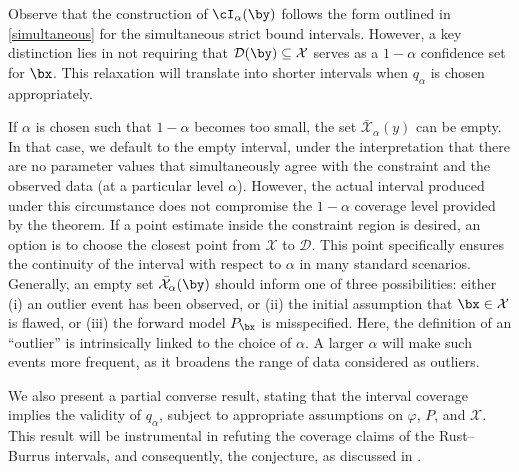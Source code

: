 \documentclass[11pt]{article}
\numberwithin{equation}{section}
\numberwithin{figure}{section}
\begin{document}
\begin{remark}
    Observe that the construction of $\cI_\alpha(\by)$ follows the form outlined in \eqref{simultaneous} for the simultaneous strict bound intervals. 
    However, a key distinction lies in not requiring that $\mathcal{D}(\by) \subseteq \mathcal X$ serves as a $1-\alpha$ confidence set for $\bx$.
    This relaxation will translate into shorter intervals when $q_\alpha$ is chosen appropriately.    
\end{remark}

\begin{remark}
If $\alpha$ is chosen such that $1-\alpha$ becomes too small, the set $\bar{\mathcal{X}}_\alpha(y)$ can be empty. 
In that case, we default to the empty interval, under the interpretation that there are no parameter values that simultaneously agree with the constraint and the observed data (at a particular level $\alpha$). 
However, the actual interval produced under this circumstance does not compromise the $1-\alpha$ coverage level provided by the theorem. 
If a point estimate inside the constraint region is desired, an option is to choose the closest point from $\mathcal X$ to $\mathcal D$. 
This point specifically ensures the continuity of the interval with respect to $\alpha$ in many standard scenarios. 
Generally, an empty set $\bar{\mathcal{X}}_\alpha(\by)$ should inform one of three possibilities: either (i) an outlier event has been observed, or (ii) the initial assumption that $\bx \in \mathcal X$ is flawed, or (iii) the forward model $P_\bx$ is misspecified.
Here, the definition of an ``outlier'' is intrinsically linked to the choice of $\alpha$. 
A larger $\alpha$ will make such events more frequent, as it broadens the range of data considered as outliers.
\end{remark}

We also present a partial converse result, stating that the interval coverage implies the validity of $q_\alpha$, subject to appropriate assumptions on $\varphi$, $P$, and $\mathcal X$. 
This result will be instrumental in refuting the coverage claims of the Rust--Burrus intervals, and consequently, the \rustburrus conjecture, as discussed in .
\end{document}
